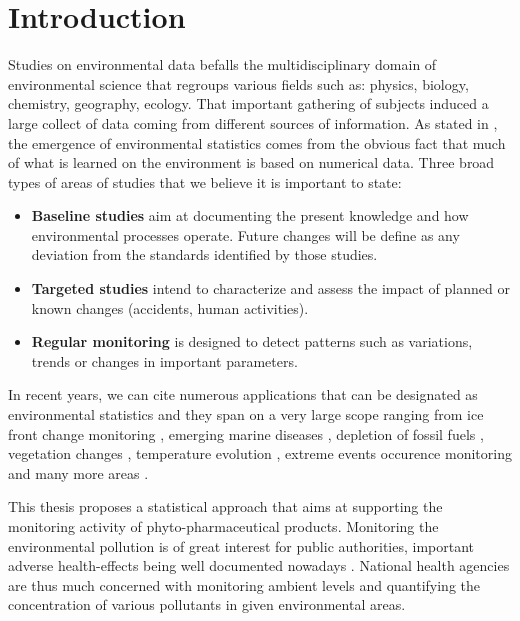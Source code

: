 \chapter{Introduction}\label{chp:1}



Studies on environmental data befalls the multidisciplinary domain of environmental science that regroups various fields such as: physics, biology, chemistry, geography, ecology. That important gathering of subjects induced a large collect of data coming from different sources of information. As stated in \cite{Manly2008}, the emergence of environmental statistics comes from the obvious fact that much of what is learned on the environment is based on numerical data. Three broad types of areas of studies that we believe it is important to state: 
\begin{itemize}
    \item \textbf{Baseline studies} aim at documenting the present knowledge and how environmental processes operate. Future changes will be define as any deviation from the standards identified by those studies.
    \item \textbf{Targeted studies} intend to characterize and assess the impact of planned or known changes (accidents, human activities). 
    \item \textbf{Regular monitoring} is designed to detect patterns such as variations, trends or changes in important parameters.  
\end{itemize}
In recent years, we can cite numerous applications that can be designated as environmental statistics and they span on a very large scope ranging from ice front change monitoring \cite{BUNCE_2018}, emerging marine diseases \cite{Harvell1999}, depletion of fossil fuels \citep{Hoeoek2013}, vegetation changes \citep{Zheng2021}, temperature evolution \citep{Shi2022}, extreme events occurence monitoring \citep{Zhao2010} and many more areas \citep{Ozgul2010,Mori2012}. 

This thesis proposes a statistical approach that aims at supporting the monitoring activity of phyto-pharmaceutical products. Monitoring the environmental pollution is of great interest for public authorities, important adverse health-effects being well documented nowadays \citep{khopkar2007,Marchant2018,NOUGADERE201432}. National health agencies are thus much concerned with monitoring ambient levels and quantifying the concentration of various pollutants in given environmental areas. 

